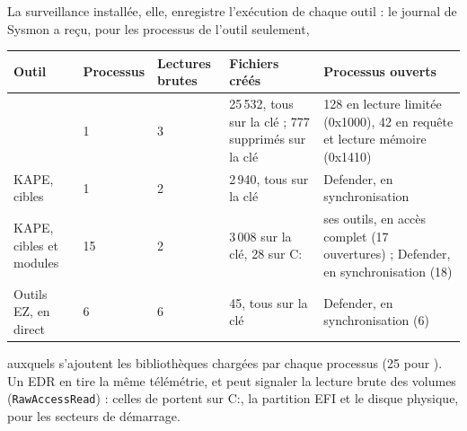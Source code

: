 \documentclass[11pt,a4paper,oneside]{report}
\begin{document}
La surveillance installée, elle, enregistre l'exécution de chaque outil : le
journal de Sysmon a reçu, pour les processus de l'outil seulement,

\begin{longtable}{@{}L{2.6cm}L{2.0cm}L{1.8cm}L{3.8cm}L{4.4cm}@{}}
\toprule
\textbf{Outil} & \textbf{Processus} & \textbf{Lectures brutes} & \textbf{Fichiers créés} & \textbf{Processus ouverts} \\
\midrule\endhead
\wac{} & 1 & 3 & 25\,532, tous sur la clé ; 777 supprimés sur la clé & 128 en lecture limitée (0x1000), 42 en requête et lecture mémoire (0x1410) \\
KAPE, cibles & 1 & 2 & 2\,940, tous sur la clé & Defender, en synchronisation \\
KAPE, cibles et modules & 15 & 2 & 3\,008 sur la clé, 28 sur C: & ses outils, en accès complet (17 ouvertures) ; Defender, en synchronisation (18) \\
Outils EZ, en direct & 6 & 6 & 45, tous sur la clé & Defender, en synchronisation (6) \\
\bottomrule
\end{longtable}

\noindent auxquels s'ajoutent les bibliothèques chargées par chaque processus
(25 pour \wac{}). Un EDR en tire la même télémétrie, et peut signaler la lecture
brute des volumes (\texttt{RawAccessRead}) : celles de \wac{} portent sur C:, la
partition EFI et le disque physique, pour les secteurs de démarrage.
\end{document}
